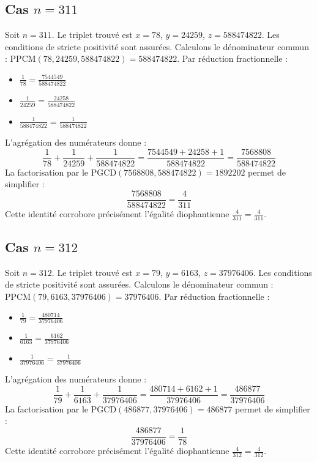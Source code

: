 \documentclass[11pt,a4paper]{article}
\begin{document}
\subsection{Cas $n = 311$}
Soit $n = 311$. Le triplet trouvé est $x = 78$, $y = 24259$, $z = 588474822$.
Les conditions de stricte positivité sont assurées.
Calculons le dénominateur commun : $\text{PPCM}(78, 24259, 588474822) = 588474822$.
Par réduction fractionnelle :
\begin{itemize}
    \item $\frac{1}{78} = \frac{7544549}{588474822}$
    \item $\frac{1}{24259} = \frac{24258}{588474822}$
    \item $\frac{1}{588474822} = \frac{1}{588474822}$
\end{itemize}
L'agrégation des numérateurs donne :
$$ \frac{1}{78} + \frac{1}{24259} + \frac{1}{588474822} = \frac{7544549 + 24258 + 1}{588474822} = \frac{7568808}{588474822} $$
La factorisation par le $\text{PGCD}(7568808, 588474822) = 1892202$ permet de simplifier :
$$ \frac{7568808}{588474822} = \frac{4}{311} $$
Cette identité corrobore précisément l'égalité diophantienne $\frac{4}{311} = \frac{4}{311}$.

\subsection{Cas $n = 312$}
Soit $n = 312$. Le triplet trouvé est $x = 79$, $y = 6163$, $z = 37976406$.
Les conditions de stricte positivité sont assurées.
Calculons le dénominateur commun : $\text{PPCM}(79, 6163, 37976406) = 37976406$.
Par réduction fractionnelle :
\begin{itemize}
    \item $\frac{1}{79} = \frac{480714}{37976406}$
    \item $\frac{1}{6163} = \frac{6162}{37976406}$
    \item $\frac{1}{37976406} = \frac{1}{37976406}$
\end{itemize}
L'agrégation des numérateurs donne :
$$ \frac{1}{79} + \frac{1}{6163} + \frac{1}{37976406} = \frac{480714 + 6162 + 1}{37976406} = \frac{486877}{37976406} $$
La factorisation par le $\text{PGCD}(486877, 37976406) = 486877$ permet de simplifier :
$$ \frac{486877}{37976406} = \frac{1}{78} $$
Cette identité corrobore précisément l'égalité diophantienne $\frac{4}{312} = \frac{4}{312}$.
\end{document}
